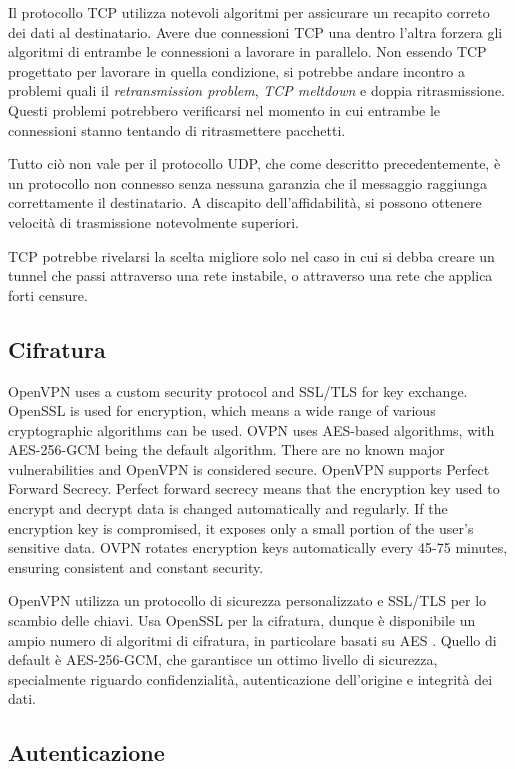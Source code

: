 Il protocollo TCP utilizza notevoli algoritmi per assicurare un recapito correto dei dati al destinatario. Avere due connessioni TCP una dentro l'altra forzera gli algoritmi di entrambe le connessioni a lavorare in parallelo. Non essendo TCP progettato per lavorare in quella condizione, si potrebbe andare incontro a problemi quali il \emph{retransmission problem}, \emph{TCP meltdown} e doppia ritrasmissione. Questi problemi potrebbero verificarsi nel momento in cui entrambe le connessioni stanno tentando di ritrasmettere pacchetti.

Tutto ciò non vale per il protocollo UDP, che come descritto precedentemente, è un protocollo non connesso senza nessuna garanzia che il messaggio raggiunga correttamente il destinatario. A discapito dell'affidabilità, si possono ottenere velocità di trasmissione notevolmente superiori.

TCP potrebbe rivelarsi la scelta migliore solo nel caso in cui si debba creare un tunnel che passi attraverso una rete instabile, o attraverso una rete che applica forti censure.

\subsection{Cifratura}
OpenVPN uses a custom security protocol and SSL/TLS for key exchange. OpenSSL is used for encryption, which means a wide range of various cryptographic algorithms can be used. OVPN uses AES-based algorithms, with AES-256-GCM being the default algorithm.
There are no known major vulnerabilities and OpenVPN is considered secure. OpenVPN supports Perfect Forward Secrecy.
Perfect forward secrecy means that the encryption key used to encrypt and decrypt data is changed automatically and regularly. If the encryption key is compromised, it exposes only a small portion of the user's sensitive data.
OVPN rotates encryption keys automatically every 45-75 minutes, ensuring consistent and constant security.

OpenVPN utilizza un protocollo di sicurezza personalizzato e SSL/TLS per lo scambio delle chiavi. Usa OpenSSL per la cifratura, dunque è disponibile un ampio numero di algoritmi di cifratura, in particolare basati su AES \cite[RFC3826]{RFC3826}. Quello di default è AES-256-GCM, che garantisce un ottimo livello di sicurezza, specialmente riguardo confidenzialità, autenticazione dell'origine e integrità dei dati.

\subsection{Autenticazione}

